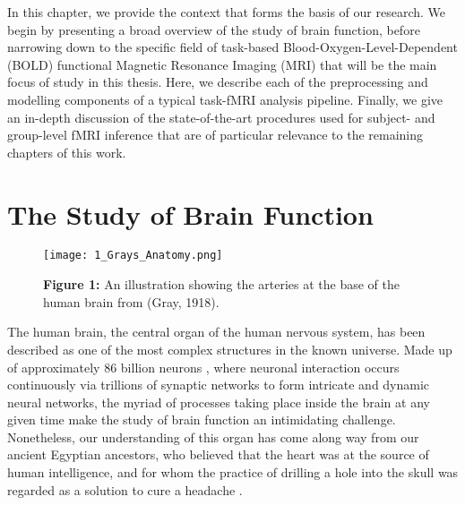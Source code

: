 In this chapter, we provide the context that forms the basis of our research. We begin by presenting a broad overview of the study of brain function, before narrowing down to the specific field of task-based Blood-Oxygen-Level-Dependent (BOLD) functional Magnetic Resonance Imaging (MRI) that will be the main focus of study in this thesis. Here, we describe each of the preprocessing and modelling components of a typical task-fMRI analysis pipeline. Finally, we give an in-depth discussion of the state-of-the-art procedures used for subject- and group-level fMRI inference that are of particular relevance to the remaining chapters of this work. 

\pagebreak

\section{The Study of Brain Function}

\begin{figure}[htbp]
\centering
	\texttt{[image: 1\_Grays\_Anatomy.png]}	
\caption*{\textbf{Figure 1:} An illustration showing the arteries at the base of the human brain from (Gray, 1918).}
\end{figure}

The human brain, the central organ of the human nervous system, has been described as one of the most complex structures in the known universe. Made up of approximately 86 billion neurons \citep{Azevedo2009-qj}, where neuronal interaction occurs continuously via trillions of synaptic networks to form intricate and dynamic neural networks, the myriad of processes taking place inside the brain at any given time make the study of brain function an intimidating challenge. Nonetheless, our understanding of this organ has come along way from our ancient Egyptian ancestors, who believed that the heart was at the source of human intelligence, and for whom the practice of drilling a hole into the skull was regarded as a solution to cure a headache \citep{Adelman1987-hs, Mohamed2014-gl}. 


